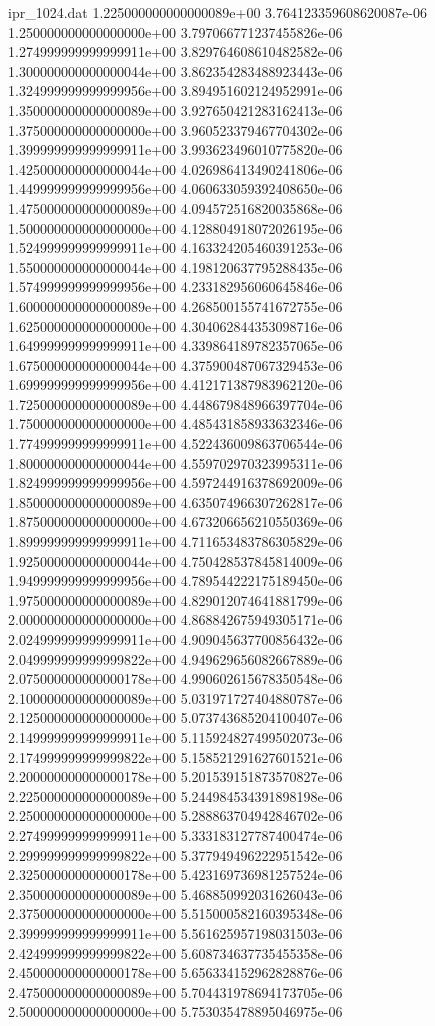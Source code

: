 \begin{filecontents}{ipr_1024.dat}
1.225000000000000089e+00 3.764123359608620087e-06
1.250000000000000000e+00 3.797066771237455826e-06
1.274999999999999911e+00 3.829764608610482582e-06
1.300000000000000044e+00 3.862354283488923443e-06
1.324999999999999956e+00 3.894951602124952991e-06
1.350000000000000089e+00 3.927650421283162413e-06
1.375000000000000000e+00 3.960523379467704302e-06
1.399999999999999911e+00 3.993623496010775820e-06
1.425000000000000044e+00 4.026986413490241806e-06
1.449999999999999956e+00 4.060633059392408650e-06
1.475000000000000089e+00 4.094572516820035868e-06
1.500000000000000000e+00 4.128804918072026195e-06
1.524999999999999911e+00 4.163324205460391253e-06
1.550000000000000044e+00 4.198120637795288435e-06
1.574999999999999956e+00 4.233182956060645846e-06
1.600000000000000089e+00 4.268500155741672755e-06
1.625000000000000000e+00 4.304062844353098716e-06
1.649999999999999911e+00 4.339864189782357065e-06
1.675000000000000044e+00 4.375900487067329453e-06
1.699999999999999956e+00 4.412171387983962120e-06
1.725000000000000089e+00 4.448679848966397704e-06
1.750000000000000000e+00 4.485431858933632346e-06
1.774999999999999911e+00 4.522436009863706544e-06
1.800000000000000044e+00 4.559702970323995311e-06
1.824999999999999956e+00 4.597244916378692009e-06
1.850000000000000089e+00 4.635074966307262817e-06
1.875000000000000000e+00 4.673206656210550369e-06
1.899999999999999911e+00 4.711653483786305829e-06
1.925000000000000044e+00 4.750428537845814009e-06
1.949999999999999956e+00 4.789544222175189450e-06
1.975000000000000089e+00 4.829012074641881799e-06
2.000000000000000000e+00 4.868842675949305171e-06
2.024999999999999911e+00 4.909045637700856432e-06
2.049999999999999822e+00 4.949629656082667889e-06
2.075000000000000178e+00 4.990602615678350548e-06
2.100000000000000089e+00 5.031971727404880787e-06
2.125000000000000000e+00 5.073743685204100407e-06
2.149999999999999911e+00 5.115924827499502073e-06
2.174999999999999822e+00 5.158521291627601521e-06
2.200000000000000178e+00 5.201539151873570827e-06
2.225000000000000089e+00 5.244984534391898198e-06
2.250000000000000000e+00 5.288863704942846702e-06
2.274999999999999911e+00 5.333183127787400474e-06
2.299999999999999822e+00 5.377949496222951542e-06
2.325000000000000178e+00 5.423169736981257524e-06
2.350000000000000089e+00 5.468850992031626043e-06
2.375000000000000000e+00 5.515000582160395348e-06
2.399999999999999911e+00 5.561625957198031503e-06
2.424999999999999822e+00 5.608734637735455358e-06
2.450000000000000178e+00 5.656334152962828876e-06
2.475000000000000089e+00 5.704431978694173705e-06
2.500000000000000000e+00 5.753035478895046975e-06

\end{filecontents}
